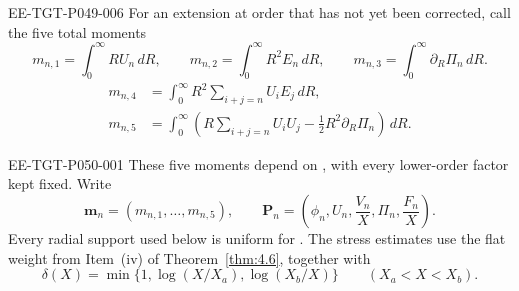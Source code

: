 \begin{EESegment}{EE-TGT-P049-006}
For an extension at order  that has not yet been corrected, call the five total moments
\begin{equation}\label{eq:5.10}
m_{n,1}=\int_0^\infty RU_n\,dR,
\qquad
m_{n,2}=\int_0^\infty R^2E_n\,dR,
\qquad
m_{n,3}=\int_0^\infty \partial_R\Pi_n\,dR.
\tag{5.10}
\end{equation}
\begin{equation}\label{eq:5.11}
\begin{aligned}
m_{n,4}&=\int_0^\infty R^2\sum_{i+j=n}U_iE_j\,dR,\\
m_{n,5}&=\int_0^\infty\left(R\sum_{i+j=n}U_iU_j-\frac12R^2\partial_R\Pi_n\right)\,dR.
\end{aligned}
\tag{5.11}
\end{equation}
\end{EESegment}

%
\begin{EESegment}{EE-TGT-P050-001}
These five moments depend on , with every lower-order factor kept fixed. Write
\[
\mathbf m_n=(m_{n,1},\ldots,m_{n,5}),
\qquad
\mathbf P_n=\left(\phi_n,U_n,\frac{V_n}{X},\Pi_n,\frac{F_n}{X}\right).
\]
Every radial support used below is uniform for . The stress estimates use the flat
weight  from Item~\textup{(iv)} of Theorem~\ref{thm:4.6}, together with
\[
\delta(X)=\min\{1,\log(X/X_a),\log(X_b/X)\}
\qquad (X_a<X<X_b).
\]
\end{EESegment}

